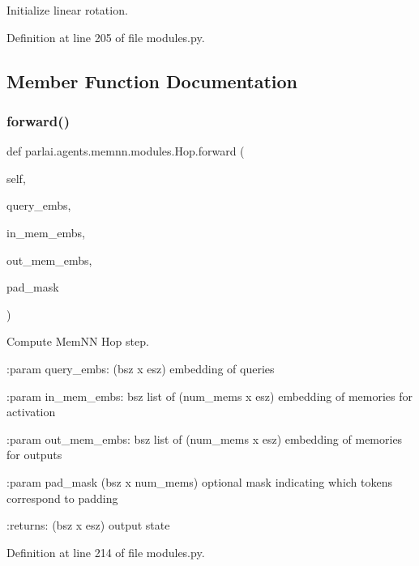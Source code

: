 \begin{DoxyVerb}Initialize linear rotation.\end{DoxyVerb}
 

Definition at line 205 of file modules.\+py.



\subsection{Member Function Documentation}
\mbox{\label{classparlai_1_1agents_1_1memnn_1_1modules_1_1Hop_ad4e6c91364efc31ac3f0239d7a7c1376}} 
\subsubsection{\texorpdfstring{forward()}{forward()}}
{\footnotesize\ttfamily def parlai.\+agents.\+memnn.\+modules.\+Hop.\+forward (\begin{DoxyParamCaption}\item[{}]{self,  }\item[{}]{query\+\_\+embs,  }\item[{}]{in\+\_\+mem\+\_\+embs,  }\item[{}]{out\+\_\+mem\+\_\+embs,  }\item[{}]{pad\+\_\+mask }\end{DoxyParamCaption})}

\begin{DoxyVerb}Compute MemNN Hop step.

:param query_embs:
    (bsz x esz) embedding of queries

:param in_mem_embs:
    bsz list of (num_mems x esz) embedding of memories for activation

:param out_mem_embs:
    bsz list of (num_mems x esz) embedding of memories for outputs

:param pad_mask
    (bsz x num_mems) optional mask indicating which tokens correspond to
    padding

:returns:
    (bsz x esz) output state
\end{DoxyVerb}
 

Definition at line 214 of file modules.\+py.



